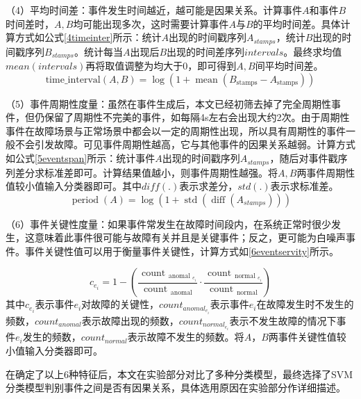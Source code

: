 （4）平均时间差：事件发生时间越近，越可能是因果关系。计算事件$A$和事件$B$时间差时，$A,B$均可能出现多次，这时需要计算事件$A$与$B$的平均时间差。具体计算方式如公式\ref{4timeinter}所示：统计$A$出现的时间戳序列$A_{stamps}$，统计$B$出现的时间戳序列$B_{stamps}$。统计每当$A$出现后$B$出现的时间差序列$intervals$。最终求均值$mean(intervals)$再将取值调整为均大于0，即可得到$A,B$间平均时间差。
\begin{equation}
    \operatorname{\text{time}\_{interval}}\left ( A,B \right ) =  \log\left ({1+  \operatorname{mean} \left ( B_\text{stamps} - A_\text{stamps} \right ) } \right )\label{4timeinter}
\end{equation}

（5）事件周期性度量：虽然在事件生成后，本文已经初筛去掉了完全周期性事件，但仍保留了周期性不完美的事件，如每隔4s左右会出现大约2次。由于周期性事件在故障场景与正常场景中都会以一定的周期性出现，所以具有周期性的事件一般不会引发故障。可见事件周期性越高，它与其他事件的因果关系越弱。计算方式如公式\ref{5eventspan}所示：统计事件$A$出现的时间戳序列$A_{stamps}$，随后对事件戳序列差分求标准差即可。计算结果值越小，则事件周期性越强。将$A,B$两事件周期性值较小值输入分类器即可。其中$diff(.)$表示求差分，$std(.)$表示求标准差。
\begin{equation}
    \operatorname{period}(A)=\log \left(1+\operatorname{std}\left(\operatorname{diff}\left(A_{stamps}\right)\right)\right)\label{5eventspan}
\end{equation}

（6）事件关键性度量：如果事件常发生在故障时间段内，在系统正常时很少发生，这意味着此事件很可能与故障有关并且是关键事件；反之，更可能为白噪声事件。事件关键性值可以用于衡量事件关键性，计算方式如\ref{6eventservity}所示。

\begin{equation}
    c_{e_{i}}=1-\left(\frac{ \text { count }_{\text {anomal }_{e_{i}}}}{\text { count }_{\text {anomal }}} \cdot \frac{  \text { count }_{\text {normal }_{e_{i}}}}{\text { count }_{\text {normal }}}\right)
    \label{6eventservity}
\end{equation}
其中$c_{e_i}$表示事件$e_i$对故障的关键性，${count}_{{anomal}_{e_i}}$表示事件$e_i$在故障发生时不发生的频数，${count}_{anomal}$表示故障出现的频数，${count}_{{normal}_{e_i}}$表示不发生故障的情况下事件$e_i$发生的频数，${count}_{normal}$表示故障不发生的频数。将$A$，$B$两事件关键性值较小值输入分类器即可。

在确定了以上6种特征后，本文在实验部分对比了多种分类模型，最终选择了SVM分类模型判别事件之间是否有因果关系，具体选用原因在实验部分作详细描述。

